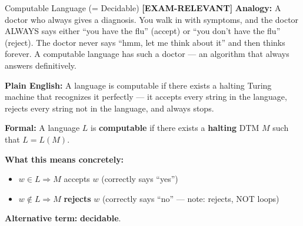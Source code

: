 \documentclass[11pt,a4paper]{article}
\newcommand{\kemark}{\textcolor{red!70!black}{\textbf{[EXAM-RELEVANT]}}}
\begin{document}
\begin{definitionbox}{Computable Language (= Decidable) \kemark}
\textbf{Analogy:} A doctor who always gives a diagnosis. You walk in with symptoms, and the doctor ALWAYS says either ``you have the flu'' (accept) or ``you don't have the flu'' (reject). The doctor never says ``hmm, let me think about it'' and then thinks forever. A computable language has such a doctor --- an algorithm that always answers definitively.

\textbf{Plain English:} A language is computable if there exists a halting Turing machine that recognizes it perfectly --- it accepts every string in the language, rejects every string not in the language, and always stops.

\textbf{Formal:} A language $L$ is \textbf{computable} if there exists a \textbf{halting} DTM $M$ such that $L = L(M)$.

\textbf{What this means concretely:}
\begin{itemize}[nosep]
\item $w \in L \Rightarrow M$ accepts $w$ (correctly says ``yes'')
\item $w \notin L \Rightarrow M$ \textbf{rejects} $w$ (correctly says ``no'' --- note: rejects, NOT loops)
\end{itemize}

\textbf{Alternative term:} \textbf{decidable}.
\end{definitionbox}
\end{document}
